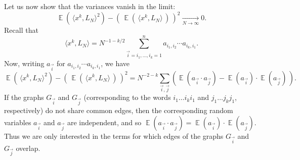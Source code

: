 \documentclass[letterpaper,11pt,oneside,reqno]{amsart}
\numberwithin{equation}{section}
\DeclareMathOperator{\EE}{\mathbb{E}}
\theoremstyle{definition}
\begin{document}
Let us now show that the variances vanish in the limit:
\begin{equation}\label{Variance_to_zero_WSCL}
\EE ( \, \langle x^k , L_N \rangle^2 ) - \left( \, \EE ( \, \langle x^k , L_N \rangle \, ) \, \right)^2 \xrightarrow[ N \to \infty ]{} 0.
\end{equation}
Recall that
\begin{equation*}
\langle x^k , L_N \rangle = N^{ -1 - k/2 } \sum_{ \vec{i} = i_1 , \ldots, i_k = 1 }^n a_{ i_1, i_2 } \cdots a_{ i_k , i_1 }.
\end{equation*}
Now, writing $ a_{ \vec{i} } $ for $ a_{ i_1, i_2 } \cdots a_{ i_k , i_1 } $, we have
\begin{equation*}
\EE ( \, \langle x^k , L_N \rangle^2 ) - \left( \, \EE ( \, \langle x^k , L_N \rangle \, ) \, \right)^2 = N^{ -2 - k } \sum_{ \vec{i} , \vec{j} } \left(  \EE \left( a_{ \vec{i} } \cdot a_{ \vec{j} } \right) - \EE ( a_{ \vec{i} } ) \cdot \EE ( a_{ \vec{j} } ) \, \right).
\end{equation*}
If the graphs $ G_{ \vec{i} } $ and $ G_{ \vec{j} } $ 
(corresponding to the words $i_1 \ldots i_ki_1$ and $j_1 \ldots j_kj_1$,
respectively)
do not share common edges, 
then the corresponding random variables $ a_{ \vec{i} } $ and $ a_{ \vec{j} } $ 
are independent, and so $ \EE( a_{ \vec{ i } } \cdot a_{ \vec{j} } ) = \EE ( a_{ \vec{i} } ) \cdot \EE( a_{ \vec{j} } ) $.  
Thus we are only interested in the terms for which edges of the 
graphs $ G_{ \vec{i} } $ and $ G_{ \vec{j} } $ overlap.
\end{document}
